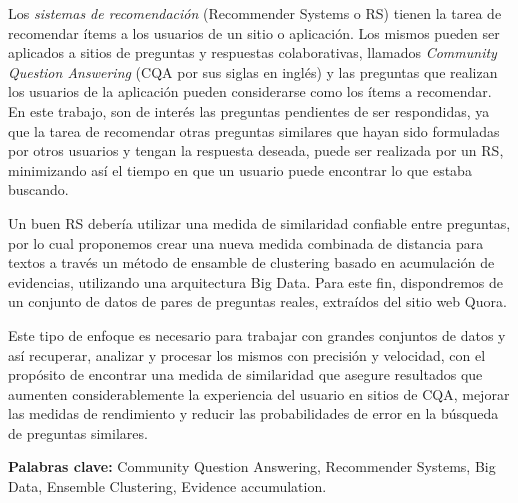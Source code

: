 \abstract

\noindent Los \textit{sistemas de recomendación} (Recommender Systems o RS) tienen la tarea de recomendar ítems a los usuarios de un sitio o aplicación. Los mismos pueden ser aplicados a sitios de preguntas y respuestas colaborativas, llamados \textit{Community Question Answering} (CQA por sus siglas en inglés) y las preguntas que realizan los usuarios de la aplicación pueden considerarse como los ítems a recomendar. En este trabajo, son de interés las preguntas pendientes de ser respondidas, ya que la tarea de recomendar otras preguntas similares que hayan sido formuladas por otros usuarios y tengan la respuesta deseada, puede ser realizada por un RS, minimizando así el tiempo en que un usuario puede encontrar lo que estaba buscando.

Un buen RS debería utilizar una medida de similaridad confiable entre preguntas, por lo cual proponemos crear una nueva medida combinada de distancia para textos a través un método de ensamble de clustering basado en acumulación de evidencias, utilizando una arquitectura Big Data. Para este fin, dispondremos de un conjunto de datos de pares de preguntas reales, extraídos del sitio web Quora.

Este tipo de enfoque es necesario para trabajar con grandes conjuntos de datos y así recuperar, analizar y procesar los mismos con precisión y velocidad, con el propósito de encontrar una medida de similaridad que asegure resultados que aumenten considerablemente la experiencia del usuario en sitios de CQA, mejorar las medidas de rendimiento y reducir las probabilidades de error en la búsqueda de preguntas similares.

\bigskip

\noindent\textbf{Palabras clave:}  Community Question Answering, Recommender Systems, Big Data, Ensemble Clustering, Evidence accumulation.